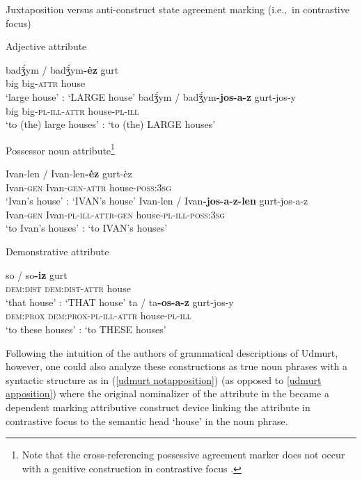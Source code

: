 \begin{exe}
\ex \rm{Juxtaposition versus anti\hyp{}construct state agreement marking (i.e.,~in contrastive focus) \citep{kelmakov-etal1999,winkler2001}}
\begin{xlist}
\ex	\rm{Adjective attribute}
\begin{xlist}
\ex 	
\gll	badǯ́ym / badǯ́ym\textbf{-ėz} gurt\\
	big {} big-\textsc{attr} house\\
\glt	‘large house’ : ‘LARGE house’
\ex	
\gll	badǯ́ym / badǯ́ym\textbf{-jos-a-z} gurt-jos-y\\
	big {} big-\textsc{pl}-\textsc{ill}-\textsc{attr} house-\textsc{pl}-\textsc{ill}\\
\glt	‘to (the) large houses’ : ‘to (the) LARGE houses’
\end{xlist}
\ex	\rm{Possessor noun attribute}\footnote{Note that the cross-referencing possessive agreement marker does not occur with a genitive construction in contrastive focus \citep[81]{kelmakov-etal1999}.}
\begin{xlist}
\ex	
\gll	Ivan-len / Ivan-len\textbf{-ėz} gurt-ėz\\
	Ivan-\textsc{gen} {} Ivan-\textsc{gen}-\textsc{attr} house-\textsc{poss:3sg}\\
\glt	‘Ivan's house’ : ‘IVAN's house’
\ex	
\gll	Ivan-len / Ivan\textbf{-jos-a-z-len} gurt-jos-a-z\\
	Ivan-\textsc{gen} {} Ivan-\textsc{pl}-\textsc{ill}-\textsc{attr}-\textsc{gen} house-\textsc{pl}-\textsc{ill}-\textsc{poss:3sg}\\
\glt	‘to Ivan's houses’ : ‘to IVAN's houses’
\end{xlist}
\ex	\rm{Demonstrative attribute} \label{udmurt det dem}
\begin{xlist}
\ex	
\gll	so / so\textbf{-iz} gurt\\
 	\textsc{dem:dist} {} \textsc{dem:dist}-\textsc{attr} house\\
\glt	‘that house’ : ‘THAT house’
\ex 	
\gll	ta / ta\textbf{-os-a-z} gurt-jos-y\\
	\textsc{dem:prox} {} \textsc{dem:prox}-\textsc{pl}-\textsc{ill}-\textsc{attr} house-\textsc{pl}-\textsc{ill}\\
\glt	 ‘to these houses’ : ‘to THESE houses’
\end{xlist}
\end{xlist}
\end{exe}
Following the intuition of the authors of grammatical descriptions of Udmurt, however, one could also analyze these constructions as true noun phrases with a syntactic structure as in (\ref{udmurt notapposition}) (as opposed to \ref{udmurt apposition}) where the original nominalizer of the attribute in the  became a dependent marking attributive construct device linking the attribute in contrastive focus to the semantic head ‘house’ in the noun phrase.
